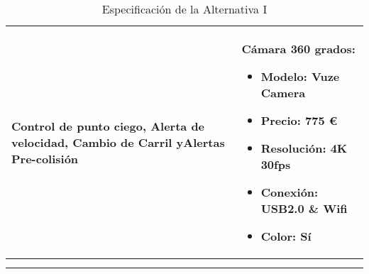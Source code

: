 \begin{center}
\begin{longtable}{p{5cm} p{8cm}}
\\ \hline

\textbf{Control de punto ciego, Alerta de velocidad, Cambio de Carril yAlertas Pre-colisión} &
Cámara 360 grados:
\begin{itemize}
    \item Modelo: Vuze Camera
    \item Precio: 775 \euro
    \item Resolución: 4K 30fps
    \item Conexión: USB2.0 \& Wifi
    \item Color: Sí
\end{itemize}

\\ \hline
\caption{Especificación de la Alternativa I}\\
\label{tab:altI}
\end{longtable}
\end{center}
